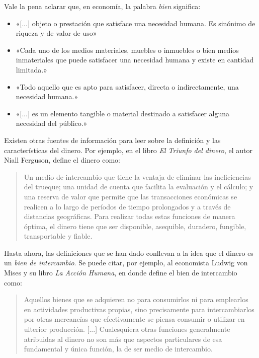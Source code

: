 \documentclass[12pt,a4paper,twoside]{book}
\begin{document}
Vale la pena aclarar que, en economía, la palabra \textit{bien} significa:

\begin{itemize}
\item «[...] objeto o prestación que satisface una necesidad humana. Es sinónimo de riqueza y de valor de uso» \cite[pág. 1687]{dic:espasacalpe}
\item «Cada uno de los medios materiales, muebles o inmuebles o bien medios inmateriales que puede satisfacer una necesidad humana y existe en cantidad limitada.» \cite{dic:clarin}
\item «Todo aquello que es apto para satisfacer, directa o indirectamente, una necesidad humana.» \cite{rae}
\item «[...] es un elemento tangible o material destinado a satisfacer alguna necesidad del público.» \cite{epedia:bien}
\end{itemize}

Existen otras fuentes de información para leer sobre la definición y las características del dinero. Por ejemplo, en el libro \textit{El Triunfo del dinero}, el autor Niall Ferguson, define el dinero como:

\begin{quotation}
Un medio de intercambio que tiene la ventaja de eliminar las ineficiencias del trueque; una unidad de cuenta que facilita la evaluación y el cálculo; y una reserva de valor que permite que las transacciones económicas se realicen a lo largo de períodos de tiempo prolongados y a través de distancias geográficas. Para realizar todas estas funciones de manera óptima, el dinero tiene que ser disponible, asequible, duradero, fungible, transportable y fiable. \cite[pág. 41]{triunfo-dinero}
\end{quotation}

Hasta ahora, las definiciones que se han dado conllevan a la idea que el dinero es un \textit{bien de intercambio}. Se puede citar, por ejemplo, al economista Ludwig von Mises y su libro \textit{La Acción Humana}, en donde define el bien de
intercambio como:

\begin{quotation}
Aquellos bienes que se adquieren no para consumirlos ni para emplearlos en actividades productivas propias, sino precisamente para intercambiarlos por otras mercancías que efectivamente se piensa consumir o utilizar en ulterior producción. [...] Cualesquiera otras funciones generalmente atribuidas al dinero no son más que aspectos particulares de esa fundamental y única función, la de ser medio de intercambio. \cite[pág. 483]{mises:lah}
\end{quotation}
\end{document}
